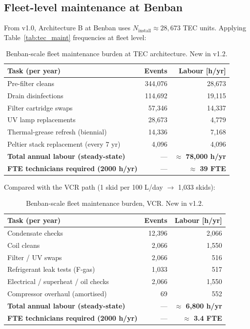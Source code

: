 \documentclass[11pt,a4paper]{article}
\begin{document}
\subsection{Fleet-level maintenance at Benban}
From v1.0, Architecture B at Benban uses $N_{\mathrm{install}}\approx 28{,}673$ TEC units. Applying Table~\ref{tab:tec_maint} frequencies at fleet level:
\begin{table}[h]
\centering\small
\caption{Benban-scale fleet maintenance burden at TEC architecture. New in v1.2.}
\label{tab:fleet_tec}
\begin{tabular}{@{}lrr@{}}
\toprule
\textbf{Task (per year)} & \textbf{Events} & \textbf{Labour [h/yr]}\\
\midrule
Pre-filter cleans    & 344{,}076  & 28{,}673 \\
Drain disinfections  & 114{,}692  & 19{,}115 \\
Filter cartridge swaps & 57{,}346 & 14{,}337 \\
UV lamp replacements & 28{,}673   & 4{,}779 \\
Thermal-grease refresh (biennial) & 14{,}336 & 7{,}168 \\
Peltier stack replacement (every 7 yr) & 4{,}096 & 4{,}096 \\
\midrule
\textbf{Total annual labour (steady-state)} & --- & \textbf{$\approx$ 78{,}000 h/yr} \\
\textbf{FTE technicians required (2000 h/yr)} & --- & \textbf{$\approx$ 39 FTE} \\
\bottomrule
\end{tabular}
\end{table}

Compared with the VCR path (1 skid per 100 L/day $\to$ 1{,}033 skids):
\begin{table}[h]
\centering\small
\caption{Benban-scale fleet maintenance burden, VCR. New in v1.2.}
\label{tab:fleet_vcr}
\begin{tabular}{@{}lrr@{}}
\toprule
\textbf{Task (per year)} & \textbf{Events} & \textbf{Labour [h/yr]}\\
\midrule
Condensate checks      & 12{,}396 & 2{,}066 \\
Coil cleans           & 2{,}066  & 1{,}550 \\
Filter / UV swaps     & 2{,}066  & 516 \\
Refrigerant leak tests (F-gas) & 1{,}033 & 517 \\
Electrical / superheat / oil checks & 2{,}066 & 1{,}550 \\
Compressor overhaul (amortised) & 69 & 552 \\
\midrule
\textbf{Total annual labour (steady-state)} & --- & \textbf{$\approx$ 6{,}800 h/yr} \\
\textbf{FTE technicians required (2000 h/yr)} & --- & \textbf{$\approx$ 3.4 FTE} \\
\bottomrule
\end{tabular}
\end{table}
\end{document}
